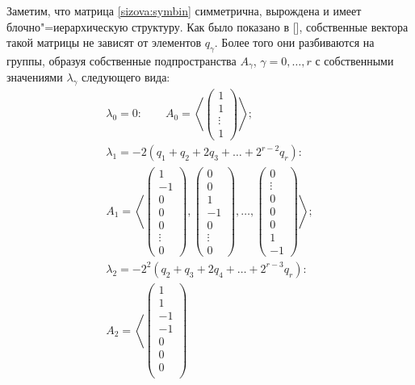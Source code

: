 Заметим, что матрица \eqref{sizova:symbin} симметрична, вырождена
и имеет блочно"=иерар\-хи\-чес\-кую структуру. Как было показано в
[], собственные вектора такой матрицы не
зависят от элементов $q_{\gamma}$. Более того они разбиваются на
группы, образуя собственные подпространства $A_\gamma$, $\gamma =
0, \ldots, r$ с собственными значениями $\lambda_\gamma$
следующего вида:
\begin{gather*}
\lambda_0 = 0: \qquad A_0 = \left<\begin{pmatrix} 1\\ 1\\
\vdots \\ 1 \end{pmatrix} \right>;\\
\lambda_1 = -2\left(q_1 + q_2 + 2 q_3 + \ldots + 2^{r - 2}
q_r\right):\\
A_1 = \left< \begin{pmatrix} 1\\ -1\\ 0\\ 0\\ 0\\ \vdots
\\ 0 \end{pmatrix}, \begin{pmatrix} 0\\ 0\\ 1\\ -1\\
0\\ \vdots \\ 0 \end{pmatrix}, \ldots,
\begin{pmatrix} 0\\
\vdots \\ 0\\ 0\\ 0\\ 1\\ -1 \end{pmatrix}\right>;\\
\lambda_2 = -2^2\left(q_2 + q_3 + 2 q_4 + \ldots + 2^{r - 3}
q_r\right):\\
A_2 = \left< \begin{pmatrix} 1\\ 1\\ -1\\ -1\\ 0\\ 0\\ 0\\

\end{pmatrix}
\end{gather*}
